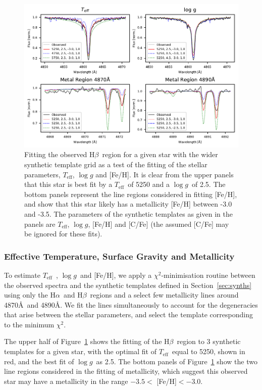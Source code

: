 \documentclass[]{aastex631}
\newcommand{\logg}{\ensuremath{\log g}\xspace}
\newcommand{\teff}{\ensuremath{T_{\mathrm{eff}}}\xspace}
\newcommand{\Ha}{H$\alpha$}
\newcommand{\Hb}{H$\beta$}
\newcommand{\feh}{[Fe/H]\xspace}
\newcommand{\ci}{$\chi^2$\xspace}
\begin{document}
\begin{figure}
\includegraphics[width=\linewidth]{Plots/Figure3.pdf}
\caption{Fitting the observed \Hb \ region for a given star with the wider synthetic template grid as a test of the fitting of the stellar parameters, \teff, \logg and \feh. It is clear from the upper panels that this star is best fit by  a \teff \ of 5250 and a \logg \ of 2.5. The bottom panels represent the line regions considered in fitting \feh, and show that this star likely has a metallicity \feh between -3.0 and -3.5. The parameters of the synthetic templates as given in the panels are \teff, \logg, \feh and [C/Fe] (the assumed [C/Fe] may be ignored for these fits).} 
\label{fig:parameter_fits_teff_logg}
\end{figure}



\subsubsection{Effective Temperature, Surface Gravity and Metallicity }\label{Fitting teff}

To estimate \teff \ , \logg \ and \feh, we apply a \ci-minimisation routine between the observed spectra and the synthetic templates defined in Section~\ref{sec:synths} using only the \Ha \ and \Hb \ regions and a select few metallicity lines around 4870\AA \ and 4890\AA . We fit the lines simultaneously to account for the degeneracies that arise between the stellar parameters, and select the template corresponding to the minimum \ci.



The upper half of Figure~\ref{fig:parameter_fits_teff_logg} shows the fitting of the \Hb \ region to 3 synthetic templates for a given star, with the optimal fit of \teff \ equal to 5250, shown in red, and the best fit of \logg \ as 2.5.
The bottom panels of Figure~\ref{fig:parameter_fits_teff_logg} show the two line regions considered in the fitting of metallicity, which suggest this observed star may have a metallicity in the range $-3.5 <$ \feh $< -3.0$.
\end{document}
